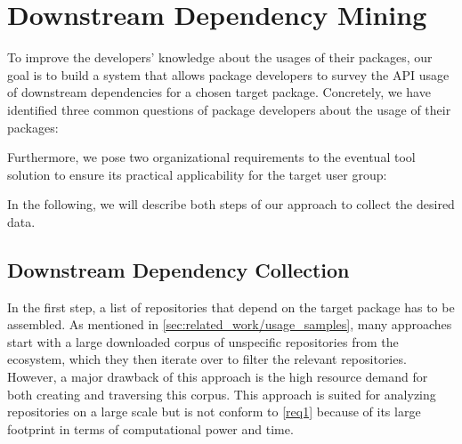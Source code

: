 \section{Downstream Dependency Mining}
\label{sec:approach}

To improve the developers' knowledge about the usages of their packages, our goal is to build a system that allows package developers to survey the API usage of downstream dependencies for a chosen target package.
Concretely, we have identified three common questions of package developers about the usage of their packages:


Furthermore, we pose two organizational requirements to the eventual tool solution to ensure its practical applicability for the target user group:


In the following, we will describe both steps of our approach to collect the desired data.

\subsection{Downstream Dependency Collection}
\label{sec:approach/dependency_collection}

In the first step, a list of repositories that depend on the target package has to be assembled.
As mentioned in \cref{sec:related_work/usage_samples}, many approaches start with a large downloaded corpus of unspecific repositories from the ecosystem, which they then iterate over to filter the relevant repositories.
However, a major drawback of this approach is the high resource demand for both creating and traversing this corpus.
This approach is suited for analyzing repositories on a large scale but is not conform to \cref{req1} because of its large footprint in terms of computational power and time.

